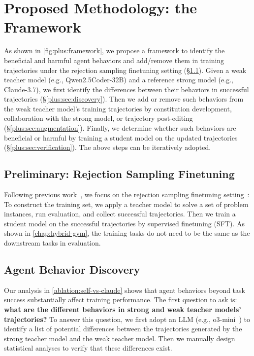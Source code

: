 \section{Proposed Methodology: the \plusname Framework}
As shown in \autoref{fig:plus:framework}, we propose a framework to identify the beneficial and harmful agent behaviors and add/remove them in training trajectories under the rejection sampling finetuning setting (\S\ref{plus:sec:preliminary}).
Given a weak teacher model (e.g., Qwen2.5Coder-32B) and a reference strong model (e.g., Claude-3.7), we first identify the differences between their behaviors in successful trajectories (\S\ref{plus:sec:discovery}). Then we add or remove such behaviors from the weak teacher model's training trajectories by constitution development, collaboration with the strong model, or trajectory post-editing (\S\ref{plus:sec:augmentation}).
Finally, we determine whether such behaviors are beneficial or harmful by training a student model on the updated trajectories (\S\ref{plus:sec:verification}).
The above steps can be iteratively adopted.




\subsection{Preliminary: Rejection Sampling Finetuning}
\label{plus:sec:preliminary}
Following previous work~\cite{swegym,R2EGym,swe-smith,swe-play,hybrid-gym}, we focus on the rejection sampling finetuning setting~\cite{rejection-sampling}:
To construct the training set, we apply a teacher model to solve a set of problem instances, run evaluation, and collect successful trajectories. 
Then we train a student model on the successful trajectories by supervised finetuning (SFT).
As shown in \autoref{chap:hybrid-gym}, the training tasks do not need to be the same as the downstream tasks in evaluation.




\subsection{Agent Behavior Discovery}
Our analysis in \autoref{ablation:self-vs-claude} shows that agent behaviors beyond task success substantially affect training performance. 
The first question to ask is: \textbf{what are the different behaviors in strong and weak teacher models' trajectories?}
To answer this question, we first adopt an LLM (e.g., o3-mini~\cite{o3_mini}) to identify a list of potential differences between the trajectories generated by the strong teacher model and the weak teacher model.
Then we manually design statistical analyses to verify that these differences exist.

